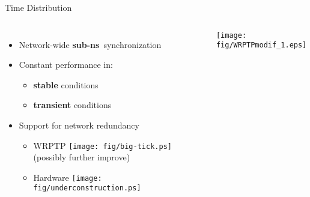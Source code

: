 \documentclass[compress,red]{beamer}
\begin{document}
\begin{frame}{Time Distribution}

  \begin{columns}[c]

  \begin{itemize}
    \item Network-wide {\bf sub-ns}~synchronization
    \vspace{0.3cm}
    \item Constant performance in:
	\begin{itemize}
	  \item {\bf stable} conditions
	  \item {\bf transient} conditions
	\end{itemize}
    \vspace{0.3cm}
    \item Support for network redundancy
    \begin{itemize}
      \item WRPTP \texttt{[image: fig/big-tick.ps]}  (possibly further improve)
      \item Hardware \texttt{[image: fig/underconstruction.ps]}
    \end{itemize}
  \end{itemize}


      \begin{center}
	\texttt{[image: fig/WRPTPmodif\_1.eps]}
      \end{center}  
    

  \end{columns}

\end{frame}
\end{document}
